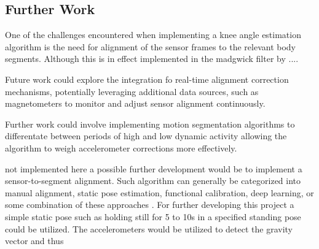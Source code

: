 \subsection{Further Work}
One of the challenges encountered when implementing a knee angle estimation algorithm is the need for alignment of the sensor frames to the relevant body segments. Although this is in effect implemented in the madgwick filter by .... 


Future work could explore the integration fo real-time alignment correction mechanisms, potentially leveraging additional data sources, such as magnetometers to monitor and adjust sensor alignment continuously.

Further work could involve implementing motion segmentation algorithms to differentate between periods of high and low dynamic activity allowing the algorithm to weigh accelerometer corrections more effectively.

not implemented here a possible further development would be to implement a sensor-to-segment alignment. Such algorithm can generally be categorized into manual alignment, static pose estimation, functional calibration, deep learning, or some combination of these approaches \cite{rhudy_knee_2024}. For further developing this project a simple static pose such as holding still for 5 to 10s in a specified standing pose could be utilized. The accelerometers would be utilized to detect the gravity vector and thus 




